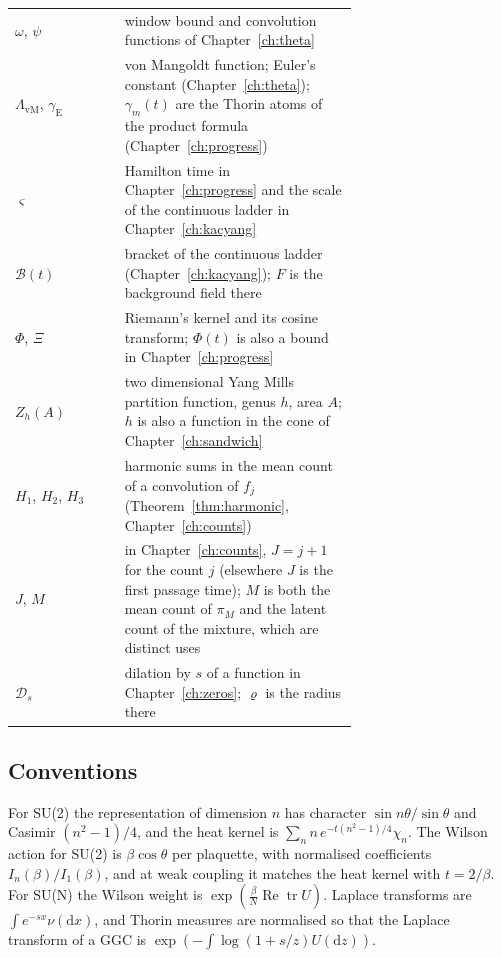 \begin{longtable}{lp{0.68\linewidth}}
$\omega$, $\psi$ & window bound and convolution functions of Chapter~\ref{ch:theta} \\
$\Lambda_{\mathrm{vM}}$, $\gamma_{\mathrm E}$ & von Mangoldt function; Euler's constant (Chapter~\ref{ch:theta}); $\gamma_m(t)$ are the Thorin atoms of the product formula (Chapter~\ref{ch:progress}) \\
$\varsigma$ & Hamilton time in Chapter~\ref{ch:progress} and the scale of the continuous ladder in Chapter~\ref{ch:kacyang} \\
$\mathcal B(t)$ & bracket of the continuous ladder (Chapter~\ref{ch:kacyang}); $F$ is the background field there \\
$\Phi$, $\Xi$ & Riemann's kernel and its cosine transform; $\Phi(t)$ is also a bound in Chapter~\ref{ch:progress} \\
$Z_h(A)$ & two dimensional Yang Mills partition function, genus $h$, area $A$; $h$ is also a function in the cone of Chapter~\ref{ch:sandwich} \\
$H_1$, $H_2$, $H_3$ & harmonic sums in the mean count of a convolution of $f_j$ (Theorem~\ref{thm:harmonic}, Chapter~\ref{ch:counts}) \\
$J$, $M$ & in Chapter~\ref{ch:counts}, $J=j+1$ for the count $j$ (elsewhere $J$ is the first passage time); $M$ is both the mean count of $\pi_M$ and the latent count of the mixture, which are distinct uses \\
$\mathcal D_s$ & dilation by $s$ of a function in Chapter~\ref{ch:zeros}; $\varrho$ is the radius there \\
\bottomrule
\end{longtable}
\endgroup

\subsection{Conventions}

For SU(2) the representation of dimension $n$ has character $\sin n\theta/\sin\theta$ and Casimir $(n^2-1)/4$, and the heat kernel is $\sum_nn\,e^{-t(n^2-1)/4}\chi_n$. The Wilson action for SU(2) is $\beta\cos\theta$ per plaquette, with normalised coefficients $I_n(\beta)/I_1(\beta)$, and at weak coupling it matches the heat kernel with $t=2/\beta$. For SU(N) the Wilson weight is $\exp(\frac\beta N\operatorname{Re}\operatorname{tr}U)$. Laplace transforms are $\int e^{-sx}\nu(\mathrm dx)$, and Thorin measures are normalised so that the Laplace transform of a GGC is $\exp(-\int\log(1+s/z)U(\mathrm dz))$.

